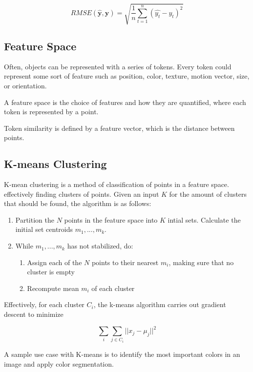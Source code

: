 \documentclass{article}
\begin{document}
\begin{multicols}{3}
\begin{itemize}
$$
RMSE(\mathbf{\hat y}, \mathbf{y}) = \sqrt{\frac{1}{n}\sum_{t=1}^n (\hat{y_t} - y_t)^2}
$$

\end{itemize}

\subsection{Feature Space}

Often, objects can be represented with a series of tokens. Every token could represent some sort of feature such as position, color, texture, motion vector, size, or orientation.

A feature space is the choice of features and how they are quantified, where each token is represented by a point.

Token similarity is defined by a feature vector, which is the distance between points.

\subsection{K-means Clustering}

K-mean clustering is a method of classification of points in a feature space. effectively finding clusters of points. Given an input $K$ for the amount of clusters that should be found, the algorithm is as follows:

\begin{enumerate}
\itemsep0em
\item Partition the $N$ points in the feature space into $K$ intial sets. Calculate the initial set centroids $m_1, ..., m_k$.

\item While $m_1, ..., m_k$ has not stabilized, do:
\begin{enumerate}
\itemsep0em
\item {Assign each of the $N$ points to their nearest $m_i$, making sure that no cluster is empty}
\item {Recompute mean $m_i$ of each cluster}
\end{enumerate}
\end{enumerate}

Effectively, for each cluster $C_i$, the k-means algorithm carries out gradient descent to minimize

$$
\sum_{i}\sum_{j \in C_i} ||x_j - \mu_j||^2
$$

A sample use case with K-means is to identify the most important colors in an image and apply color segmentation.


\end{multicols}
\end{document}
